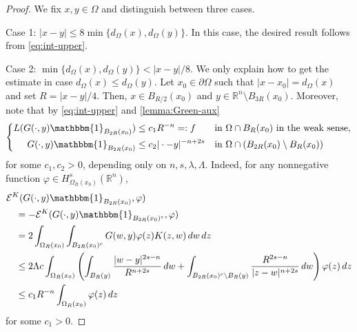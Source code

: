 \documentclass[11pt,reqno]{amsart}
\theoremstyle{plain}
\theoremstyle{definition}
\numberwithin{equation}{section}
\newcommand{\R}{\mathbb{R}}
\newcommand{\1}{\mathbbm{1}}
\renewcommand{\d}{\textnormal{\,d}}
\begin{document}
\begin{proof}
We fix $x,y \in \Omega$ and distinguish between three cases.

Case 1: $|x-y| \le 8 \min \{ d_{\Omega}(x) , d_{\Omega}(y) \}$. In this case, the desired result follows from \eqref{eq:int-upper}.

Case 2: $\min\{ d_{\Omega}(x) , d_{\Omega}(y) \} < |x-y|/8$. We only explain how to get the estimate in case $d_{\Omega}(x) \le d_{\Omega}(y)$.
Let $x_0 \in \partial \Omega$ such that $|x-x_0| = d_{\Omega}(x)$ and set $R = |x-y|/4$. Then, $x \in B_{R/2}(x_0)$ and $y \in \R^n \setminus B_{3R}(x_0)$. Moreover, note that by \eqref{eq:int-upper} and \autoref{lemma:Green-aux}
\begin{align*}
\left\{
\begin{aligned}
L(G(\cdot,y)\mathbbm{1}_{B_{2R}(x_0)}) &\le c_1 R^{-n}=:f &&\text{in } \Omega \cap B_{R}(x_0) \text{ in the weak sense}, \\
G(\cdot,y)\mathbbm{1}_{B_{2R}(x_0)} &\le c_2 |\cdot-y|^{-n+2s} &&\text{in } \Omega \cap (B_{2R}(x_0) \setminus B_{R}(x_0))
\end{aligned}
\right.
\end{align*}
for some $c_1, c_2 > 0$, depending only on $n,s,\lambda,\Lambda$. Indeed, for any nonnegative function $\varphi \in H^s_{\Omega_R(x_0)}(\R^n)$,
\begin{align*}
&\mathcal{E}^K(G(\cdot, y) \mathbbm{1}_{B_{2R}(x_0)}, \varphi) \\
&\quad = - \mathcal{E}^K(G(\cdot, y) \mathbbm{1}_{B_{2R}(x_0)^c}, \varphi) \\
&\quad = 2\int_{\Omega_R(x_0)} \int_{B_{2R}(x_0)^c} G(w, y) \varphi(z) K(z, w) \d w \d z \\
&\quad \leq 2\Lambda c \int_{\Omega_R(x_0)} \left( \int_{B_R(y)} \frac{|w-y|^{2s-n}}{R^{n+2s}} \d w + \int_{B_{2R}(x_0)^c \setminus B_R(y)} \frac{R^{2s-n}}{|z-w|^{n+2s}} \d w \right) \varphi(z) \d z \\
&\quad \leq c_1 R^{-n} \int_{\Omega_R(x_0)} \varphi(z) \d z
\end{align*}
for some $c_1>0$.


\end{proof}
\end{document}
